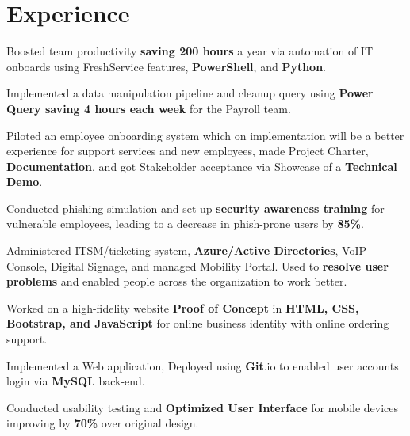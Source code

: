 \documentclass[]{pratham-resume-openfont}
\begin{document}
\hfill
\begin{minipage}[t]{0.65\textwidth} 


\section{Experience}
\vspace{\topsep} %
\begin{tightemize}
\item Boosted team productivity {\bf saving 200 hours} a year via automation of IT onboards using FreshService features, {\bf PowerShell}, and {\bf Python}. 
\item Implemented a data manipulation pipeline and cleanup query using {\bf Power Query saving 4 hours each week} for the Payroll team.
\item Piloted an employee onboarding system which on implementation will be a better experience for support services and new employees, made Project Charter, {\bf Documentation}, and got Stakeholder acceptance via Showcase of a {\bf Technical Demo}.
\item Conducted phishing simulation and set up {\bf security awareness training} for vulnerable employees, leading to a decrease in phish-prone users by {\bf 85\%}.
\item Administered ITSM/ticketing system, {\bf Azure/Active Directories}, VoIP Console, Digital Signage, and managed Mobility Portal. Used to {\bf resolve user problems} and enabled people across the organization to work better.
\end{tightemize}
\sectionsep

\begin{tightemize}
\item Worked on a high-fidelity website {\bf Proof of Concept} in {\bf HTML, CSS, Bootstrap, and JavaScript} for online business identity with online ordering support.
\item Implemented a Web application, Deployed using {\bf Git}.io to enabled user accounts login via {\bf MySQL} back-end.
\item Conducted usability testing and {\bf Optimized User Interface} for mobile devices improving by {\bf 70\%} over original design.
\end{tightemize}
\sectionsep


\end{minipage}
\end{document}
